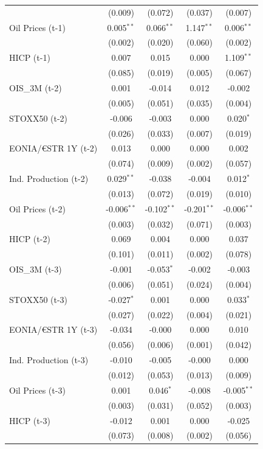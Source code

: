 \begin{longtable}[t]{lcccc}
 & (0.009) & (0.072) & (0.037) & (0.007)\\
Oil Prices (t-1) & 0.005$^{**}$ & 0.066$^{**}$ & 1.147$^{**}$ & 0.006$^{**}$\\
 & (0.002) & (0.020) & (0.060) & (0.002)\\
HICP (t-1) & 0.007 & 0.015 & 0.000 & 1.109$^{**}$\\
 & (0.085) & (0.019) & (0.005) & (0.067)\\
OIS\_3M (t-2) & 0.001 & -0.014 & 0.012 & -0.002\\
 & (0.005) & (0.051) & (0.035) & (0.004)\\
STOXX50 (t-2) & -0.006 & -0.003 & 0.000 & 0.020$^{*}$\\
 & (0.026) & (0.033) & (0.007) & (0.019)\\
EONIA/€STR 1Y (t-2) & 0.013 & 0.000 & 0.000 & 0.002\\
 & (0.074) & (0.009) & (0.002) & (0.057)\\
Ind. Production (t-2) & 0.029$^{**}$ & -0.038 & -0.004 & 0.012$^{*}$\\
 & (0.013) & (0.072) & (0.019) & (0.010)\\
Oil Prices (t-2) & -0.006$^{**}$ & -0.102$^{**}$ & -0.201$^{**}$ & -0.006$^{**}$\\
 & (0.003) & (0.032) & (0.071) & (0.003)\\
HICP (t-2) & 0.069 & 0.004 & 0.000 & 0.037\\
 & (0.101) & (0.011) & (0.002) & (0.078)\\
OIS\_3M (t-3) & -0.001 & -0.053$^{*}$ & -0.002 & -0.003\\
 & (0.006) & (0.051) & (0.024) & (0.004)\\
STOXX50 (t-3) & -0.027$^{*}$ & 0.001 & 0.000 & 0.033$^{*}$\\
 & (0.027) & (0.022) & (0.004) & (0.021)\\
EONIA/€STR 1Y (t-3) & -0.034 & -0.000 & 0.000 & 0.010\\
 & (0.056) & (0.006) & (0.001) & (0.042)\\
Ind. Production (t-3) & -0.010 & -0.005 & -0.000 & 0.000\\
 & (0.012) & (0.053) & (0.013) & (0.009)\\
Oil Prices (t-3) & 0.001 & 0.046$^{*}$ & -0.008 & -0.005$^{**}$\\
 & (0.003) & (0.031) & (0.052) & (0.003)\\
HICP (t-3) & -0.012 & 0.001 & 0.000 & -0.025\\
 & (0.073) & (0.008) & (0.002) & (0.056)\\

\end{longtable}
